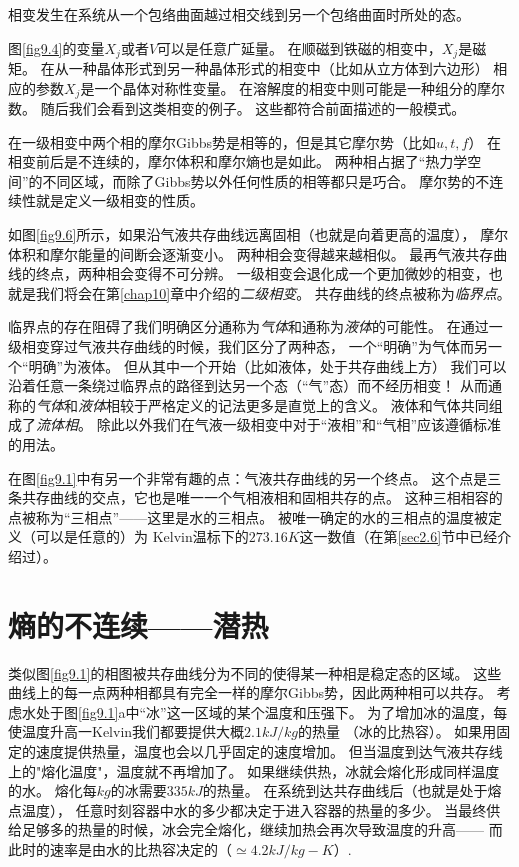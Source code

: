 相变发生在系统从一个包络曲面越过相交线到另一个包络曲面时所处的态。

图\ref{fig9.4}的变量$X_j$或者$V$可以是任意广延量。
在顺磁到铁磁的相变中，$X_j$是磁矩。
在从一种晶体形式到另一种晶体形式的相变中（比如从立方体到六边形）
相应的参数$X_j$是一个晶体对称性变量。
在溶解度的相变中则可能是一种组分的摩尔数。
随后我们会看到这类相变的例子。
这些都符合前面描述的一般模式。

在一级相变中两个相的摩尔Gibbs势是相等的，但是其它摩尔势（比如$u,t,f$）
在相变前后是不连续的，摩尔体积和摩尔熵也是如此。
两种相占据了“热力学空间”的不同区域，而除了Gibbs势以外任何性质的相等都只是巧合。
摩尔势的不连续性就是定义一级相变的性质。

如图\ref{fig9.6}所示，如果沿气液共存曲线远离固相（也就是向着更高的温度），
摩尔体积和摩尔能量的间断会逐渐变小。
两种相会变得越来越相似。
最再气液共存曲线的终点，两种相会变得不可分辨。
一级相变会退化成一个更加微妙的相变，也就是我们将会在第\ref{chap10}章中介绍的{\it 二级相变}。
共存曲线的终点被称为{\it 临界点}。

临界点的存在阻碍了我们明确区分通称为{\it 气体}和通称为{\it 液体}的可能性。
在通过一级相变穿过气液共存曲线的时候，我们区分了两种态，
一个“明确”为气体而另一个“明确”为液体。
但从其中一个开始（比如液体，处于共存曲线上方）
我们可以沿着任意一条绕过临界点的路径到达另一个态（“气”态）而不经历相变！
从而通称的{\it 气体}和{\it 液体}相较于严格定义的记法更多是直觉上的含义。
液体和气体共同组成了{\it 流体相}。
除此以外我们在气液一级相变中对于“液相”和“气相”应该遵循标准的用法。

在图\ref{fig9.1}中有另一个非常有趣的点：气液共存曲线的另一个终点。
这个点是三条共存曲线的交点，它也是唯一一个气相液相和固相共存的点。
这种三相相容的点被称为“三相点”——这里是水的三相点。
被唯一确定的水的三相点的温度被定义（可以是任意的）为
Kelvin温标下的$273.16K$这一数值（在第\ref{sec2.6}节中已经介绍过）。

\section{熵的不连续——潜热}
\label{sec9.2}

类似图\ref{fig9.1}的相图被共存曲线分为不同的使得某一种相是稳定态的区域。
这些曲线上的每一点两种相都具有完全一样的摩尔Gibbs势，因此两种相可以共存。
考虑水处于图\ref{fig9.1}a中“冰”这一区域的某个温度和压强下。
为了增加冰的温度，每使温度升高一Kelvin我们都要提供大概$2.1kJ/kg$的热量
（冰的比热容）。
如果用固定的速度提供热量，温度也会以几乎固定的速度增加。
但当温度到达气液共存线上的"熔化温度"，温度就不再增加了。
如果继续供热，冰就会熔化形成同样温度的水。
熔化每$kg$的冰需要$335kJ$的热量。
在系统到达共存曲线后（也就是处于熔点温度），
任意时刻容器中水的多少都决定于进入容器的热量的多少。
当最终供给足够多的热量的时候，冰会完全熔化，继续加热会再次导致温度的升高——
而此时的速率是由水的比热容决定的（$\simeq 4.2kJ/kg-K$）.

